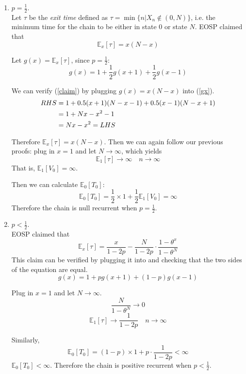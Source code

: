 \begin{enumerate}
        \item $p = \frac{1}{2}$.\\
        Let $\tau$ be the \emph{exit time} defined as $\tau = \min\{ n | X_n \notin (0,N) \}$, i.e. the minimum time for the chain to be either in state $0$ or state $N$. EOSP claimed that
        \begin{equation}
            \label{claim}
            \mathbb{E}_x[\tau] = x(N-x)
        \end{equation}

        Let $g(x) = \mathbb{E}_x[\tau]$, since $p = \frac{1}{2}$:
        \begin{equation}
            \label{gx}
            g(x) = 1 + \frac{1}{2}g(x+1) + \frac{1}{2}g(x-1)
        \end{equation}
        
        We can verify (\ref{claim}) by plugging $g(x) = x(N-x)$ into (\ref{gx}).
        \begin{align}
            RHS &= 1 + 0.5(x+1)(N-x-1) + 0.5(x-1)(N-x+1) \notag \\
            &= 1 + Nx - x^2 -1 \notag \\
            &= Nx - x^2 = LHS \notag
        \end{align}

        Therefore $\mathbb{E}_x[\tau] = x(N-x)$. Then we can again follow our previous proofs: plug in $x=1$ and let $N\to\infty$, which yields
        \[ \mathbb{E}_1[\tau] \to \infty \quad n \to \infty \]
        That is, $\mathbb{E}_1[V_0] = \infty$.

        Then we can calculate $\mathbb{E}_0[T_0]$:
        \[ \mathbb{E}_0[T_0] = \frac{1}{2}\times 1 + \frac{1}{2}\mathbb{E}_1[V_0] = \infty \]
        Therefore the chain is null recurrent when $p=\frac{1}{2}$.

        \item $p<\frac{1}{2}$.\\
        EOSP claimed that
        \[ \mathbb{E}_x[\tau] = \frac{x}{1-2p}-\frac{N}{1-2p}\cdot\frac{1-\theta^x}{1-\theta^N} \]
        This claim can be verified by plugging it into and checking that the two sides of the equation are equal.
        \[ g(x) = 1 + pg(x+1) + (1-p)g(x-1) \]

        Plug in $x=1$ and let $N\to\infty$.
        \[ \frac{N}{1-\theta^N} \to 0\]
        \[ \mathbb{E}_1[\tau] \to \frac{1}{1-2p} \quad n \to \infty \]

        Similarly,
        \[ \mathbb{E}_0[T_0] = (1-p) \times 1 + p \cdot \frac{1}{1-2p} < \infty \]
        $\mathbb{E}_0[T_0] < \infty$. Therefore the chain is positive recurrent when $p < \frac{1}{2}$.
    \end{enumerate}



